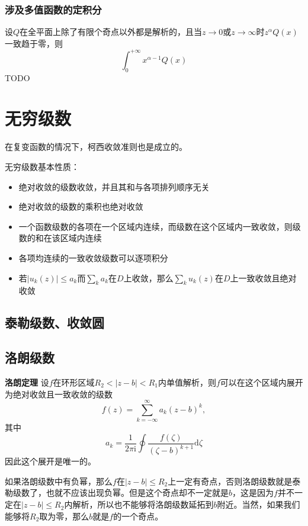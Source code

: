 \documentclass[UTF8]{ctexart}
\begin{document}
\subsubsection{涉及多值函数的定积分}


设$Q$在全平面上除了有限个奇点以外都是解析的，且当$z \to 0$或$z \to \infty$时$z^\alpha Q(x)$一致趋于零，则
\[
\int_0^{+\infty} x^{\alpha - 1} Q(x)
\] TODO

\hypertarget{ux65e0ux7a77ux7ea7ux6570}{%
\section{无穷级数}\label{ux65e0ux7a77ux7ea7ux6570}}

在复变函数的情况下，柯西收敛准则也是成立的。

无穷级数基本性质：
\begin{itemize}
    \item 绝对收敛的级数收敛，并且其和与各项排列顺序无关
    \item 绝对收敛的级数的乘积也绝对收敛
    \item 一个函数级数的各项在一个区域内连续，而级数在这个区域内一致收敛，则级数的和在该区域内连续
    \item 各项均连续的一致收敛级数可以逐项积分 
    \item 若$|u_k(z)| \leq a_k$而$\sum_k a_k$在$D$上收敛，那么$\sum_k u_k(z)$在$D$上一致收敛且绝对收敛
\end{itemize}

\hypertarget{ux6cf0ux52d2ux7ea7ux6570ux6536ux655bux5706}{%
\subsection{泰勒级数、收敛圆}\label{ux6cf0ux52d2ux7ea7ux6570ux6536ux655bux5706}}

\hypertarget{ux6d1bux6717ux7ea7ux6570}{%
\subsection{洛朗级数}\label{ux6d1bux6717ux7ea7ux6570}}

\textbf{洛朗定理}
设$f$在环形区域$R_2 < |z-b| < R_1$内单值解析，则$f$可以在这个区域内展开为绝对收敛且一致收敛的级数
\[
f(z) = \sum_{k=-\infty}^\infty a_k (z-b)^k,
\] 其中 \[
a_k = \frac{1}{2\pi \mathrm{i}} \oint \frac{f(\zeta)}{(\zeta - b)^{k+1}}\mathrm{d}\zeta
\] 因此这个展开是唯一的。

如果洛朗级数中有负幂，那么$f$在$|z-b|\leq R_2$上一定有奇点，否则洛朗级数就是泰勒级数了，也就不应该出现负幂。但是这个奇点却不一定就是$b$，这是因为$f$并不一定在$|z-b|\leq R_2$内解析，所以也不能够将洛朗级数延拓到$b$附近。当然，如果我们能够将$R_2$取为零，那么$b$就是$f$的一个奇点。
\end{document}
